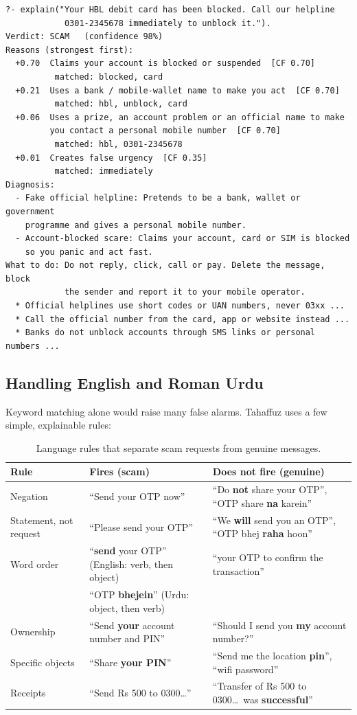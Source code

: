 \documentclass[11pt,a4paper]{article}
\begin{document}
\begin{lstlisting}
?- explain("Your HBL debit card has been blocked. Call our helpline
            0301-2345678 immediately to unblock it.").
Verdict: SCAM   (confidence 98%)
Reasons (strongest first):
  +0.70  Claims your account is blocked or suspended  [CF 0.70]
          matched: blocked, card
  +0.21  Uses a bank / mobile-wallet name to make you act  [CF 0.70]
          matched: hbl, unblock, card
  +0.06  Uses a prize, an account problem or an official name to make
         you contact a personal mobile number  [CF 0.70]
          matched: hbl, 0301-2345678
  +0.01  Creates false urgency  [CF 0.35]
          matched: immediately
Diagnosis:
  - Fake official helpline: Pretends to be a bank, wallet or government
    programme and gives a personal mobile number.
  - Account-blocked scare: Claims your account, card or SIM is blocked
    so you panic and act fast.
What to do: Do not reply, click, call or pay. Delete the message, block
            the sender and report it to your mobile operator.
  * Official helplines use short codes or UAN numbers, never 03xx ...
  * Call the official number from the card, app or website instead ...
  * Banks do not unblock accounts through SMS links or personal numbers ...
\end{lstlisting}

\subsection{Handling English and Roman Urdu}
\label{sec:language}
Keyword matching alone would raise many false alarms. Tahaffuz uses a few simple, explainable rules:

\begin{table}[H]
\centering
\small
\begin{tabularx}{\linewidth}{l X X}
\toprule
\textbf{Rule} & \textbf{Fires (scam)} & \textbf{Does not fire (genuine)} \\
\midrule
Negation        & ``Send your OTP now'' & ``Do \textbf{not} share your OTP'', ``OTP share \textbf{na} karein'' \\
Statement, not request & ``Please send your OTP'' & ``We \textbf{will} send you an OTP'', ``OTP bhej \textbf{raha} hoon'' \\
Word order      & ``\textbf{send} your OTP'' (English: verb, then object) & ``your OTP to confirm the transaction'' \\
                & ``OTP \textbf{bhejein}'' (Urdu: object, then verb) & \\
Ownership       & ``Send \textbf{your} account number and PIN'' & ``Should I send you \textbf{my} account number?'' \\
Specific objects& ``Share \textbf{your PIN}'' & ``Send me the location \textbf{pin}'', ``wifi password'' \\
Receipts        & ``Send Rs 500 to 0300\ldots'' & ``Transfer of Rs 500 to 0300\ldots\ was \textbf{successful}'' \\
\bottomrule
\end{tabularx}
\caption{Language rules that separate scam requests from genuine messages.}
\end{table}
\end{document}
